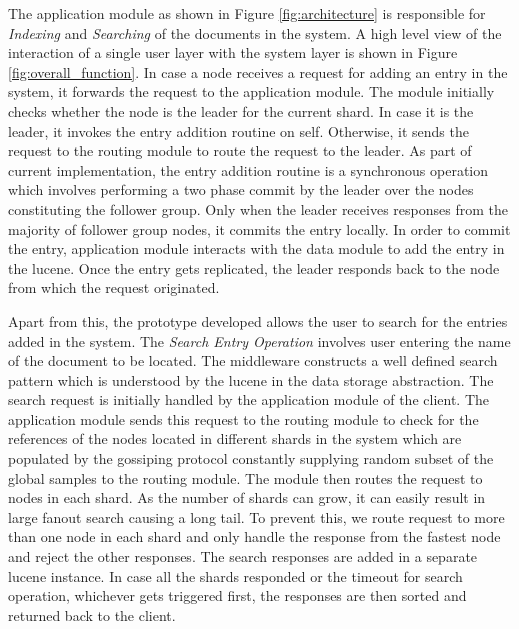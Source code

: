 \documentclass[12pt,a4paper,twoside,openright]{book}
\begin{document}
\par The application module as shown in Figure \ref{fig:architecture} is responsible for \textit{Indexing} and \textit{Searching} of the documents in the system. A high level view of the interaction of a single user layer with the system layer is shown in Figure \ref{fig:overall_function}. In case a node receives a request for adding an entry in the system, it forwards the request to the application module. The module initially checks whether the node is the leader for the current shard. In case it is the leader, it invokes the entry addition routine on self. Otherwise, it sends the request to the routing module to route the request to the leader. As part of current implementation, the entry addition routine is a synchronous operation which involves performing a two phase commit by the leader over the nodes constituting the follower group. Only when the leader receives responses from the majority of follower group nodes, it commits the entry locally. In order to commit the entry, application module interacts with the data module to add the entry in the lucene. Once the entry gets replicated, the leader responds back to the node from which the request originated. 

\par Apart from this, the prototype developed allows the user to search for the entries added in the system. The \textit{Search Entry Operation} involves user entering the name of the document to be located. The middleware constructs a well defined search pattern which is understood by the lucene in the data storage abstraction. The search request is initially handled by the application module of the client. The application module sends this request to the routing module to check for the references of the nodes located in different shards in the system which are populated by the gossiping protocol constantly supplying random subset of the global samples to the routing module. The module then routes the request to nodes in each shard. As the number of shards can grow, it can easily result in large fanout search causing a long tail. To prevent this, we route request to more than one node in each shard and only handle the response from the fastest node and reject the other responses. The search responses are added in a separate lucene instance. In case all the shards responded or the timeout for search operation, whichever gets triggered first, the responses are then sorted and returned back to the client. 
\end{document}
